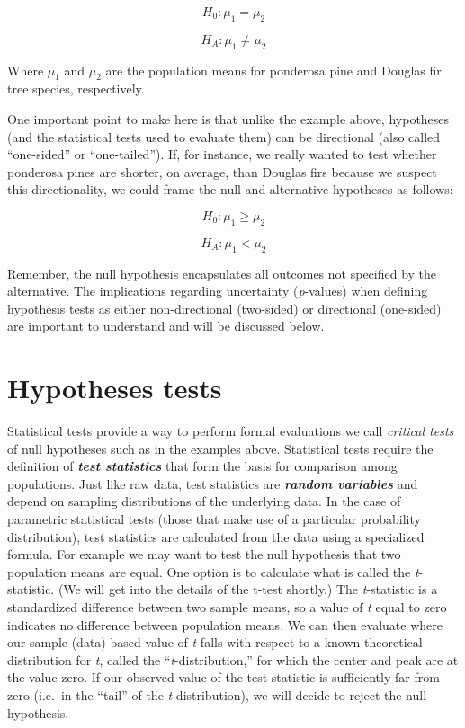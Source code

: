 \documentclass[]{book}
\begin{document}
\[H_0 : \mu_1 = \mu_2\]

\[H_A: \mu_1 \neq \mu_2\]

Where \(\mu_1\) and \(\mu_2\) are the population means for ponderosa pine and Douglas fir tree species, respectively.

One important point to make here is that unlike the example above, hypotheses (and the statistical tests used to evaluate them) can be directional (also called ``one-sided'' or ``one-tailed''). If, for instance, we really wanted to test whether ponderosa pines are shorter, on average, than Douglas firs because we suspect this directionality, we could frame the null and alternative hypotheses as follows:

\[H_0 : \mu_1 \geq \mu_2\]

\[H_A: \mu_1 < \mu_2\]

Remember, the null hypothesis encapsulates all outcomes not specified by the alternative. The implications regarding uncertainty (\emph{p}-values) when defining hypothesis tests as either non-directional (two-sided) or directional (one-sided) are important to understand and will be discussed below.

\hypertarget{hypotheses-tests}{%
\section{Hypotheses tests}\label{hypotheses-tests}}

Statistical tests provide a way to perform formal evaluations we call \emph{critical tests} of null hypotheses such as in the examples above. Statistical tests require the definition of \textbf{\emph{test statistics}} that form the basis for comparison among populations. Just like raw data, test statistics are \textbf{\emph{random variables}} and depend on sampling distributions of the underlying data. In the case of parametric statistical tests (those that make use of a particular probability distribution), test statistics are calculated from the data using a specialized formula. For example we may want to test the null hypothesis that two population means are equal. One option is to calculate what is called the \emph{t}-statistic. (We will get into the details of the t-test shortly.) The \emph{t}-statistic is a standardized difference between two sample means, so a value of \emph{t} equal to zero indicates no difference between population means. We can then evaluate where our sample (data)-based value of \emph{t} falls with respect to a known theoretical distribution for \emph{t}, called the ``\emph{t}-distribution,'' for which the center and peak are at the value zero. If our observed value of the test statistic is sufficiently far from zero (i.e.~in the ``tail'' of the \emph{t}-distribution), we will decide to reject the null hypothesis.
\end{document}
